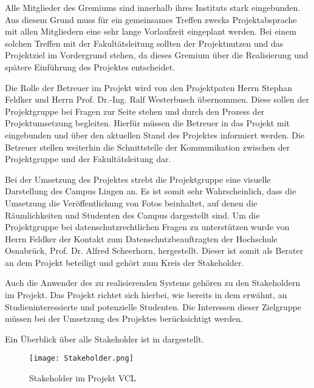 Alle Mitglieder des Gremiums sind innerhalb ihres Instituts stark eingebunden.
Aus diesem Grund muss für ein gemeinsames Treffen zwecks Projektabsprache mit
allen Mitgliedern eine sehr lange Vorlaufzeit eingeplant werden. Bei einem
solchen Treffen mit der Fakultätsleitung sollten der Projektnutzen und das
Projektziel im Vordergrund stehen, da dieses Gremium über die Realisierung und
spätere Einführung des Projektes entscheidet.

Die Rolle der Betreuer im Projekt wird von den Projektpaten Herrn Stephan
Feldker und Herrn Prof. Dr.-Ing. Ralf Westerbusch übernommen. Diese sollen der
Projektgruppe bei Fragen zur Seite stehen und durch den Prozess der
Projektumsetzung begleiten. Hierfür müssen die Betreuer in das Projekt mit
eingebunden und über den aktuellen Stand des Projektes informiert werden. Die
Betreuer stellen weiterhin die Schnittstelle der Kommunikation zwischen der
Projektgruppe und der Fakultätsleitung dar.

Bei der Umsetzung des Projektes strebt die Projektgruppe eine visuelle
Darstellung des Campus Lingen an. Es ist somit sehr Wahrscheinlich, dass die
Umsetzung die Veröffentlichung von Fotos beinhaltet, auf denen die
Räumlichkeiten und Studenten des Campus dargestellt sind. Um die Projektgruppe
bei datenschutzrechtlichen Fragen zu unterstützen wurde von Herrn Feldker der
Kontakt zum Datenschutzbeauftragten der Hochschule Osnabrück, Prof. Dr. Alfred
Scheerhorn, hergestellt. Dieser ist somit als Berater an dem Projekt beteiligt
und gehört zum Kreis der Stakeholder.

Auch die Anwender des zu realisierenden Systems gehören zu den Stakeholdern im
Projekt. Das Projekt richtet sich hierbei, wie bereits in dem
 erwähnt, an Studieninteressierte und potenzielle
Studenten. Die Interessen dieser Zielgruppe müssen bei der Umsetzung des
Projektes berücksichtigt werden.

Ein Überblick über alle Stakeholder ist in  dargestellt.

\begin{figure}[htb] 
\centering
\texttt{[image: Stakeholder.png]}
\caption[Stakeholder im Projekt \acs{VCL}]{Stakeholder im Projekt \acs{VCL}\protect\footnotemark}
\label{fig:Stakeholder}
\end{figure}
